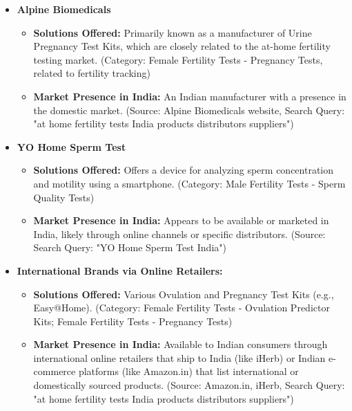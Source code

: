 \documentclass{article}
\begin{document}
\begin{itemize}[label=\textbullet]
    \item \textbf{Alpine Biomedicals}
    \begin{itemize}[label=--]
        \item \textbf{Solutions Offered:} Primarily known as a manufacturer of Urine Pregnancy Test Kits, which are closely related to the at-home fertility testing market. (Category: Female Fertility Tests - Pregnancy Tests, related to fertility tracking)
        \item \textbf{Market Presence in India:} An Indian manufacturer with a presence in the domestic market. (Source: Alpine Biomedicals website, Search Query: "at home fertility tests India products distributors suppliers")
    \end{itemize}
    \vspace{0.5em} %

    \item \textbf{YO Home Sperm Test}
    \begin{itemize}[label=--]
        \item \textbf{Solutions Offered:} Offers a device for analyzing sperm concentration and motility using a smartphone. (Category: Male Fertility Tests - Sperm Quality Tests)
        \item \textbf{Market Presence in India:} Appears to be available or marketed in India, likely through online channels or specific distributors. (Source: Search Query: "YO Home Sperm Test India")
    \end{itemize}
    \vspace{0.5em} %

    \item \textbf{International Brands via Online Retailers:}
    \begin{itemize}[label=--]
        \item \textbf{Solutions Offered:} Various Ovulation and Pregnancy Test Kits (e.g., Easy@Home). (Category: Female Fertility Tests - Ovulation Predictor Kits; Female Fertility Tests - Pregnancy Tests)
        \item \textbf{Market Presence in India:} Available to Indian consumers through international online retailers that ship to India (like iHerb) or Indian e-commerce platforms (like Amazon.in) that list international or domestically sourced products. (Source: Amazon.in, iHerb, Search Query: "at home fertility tests India products distributors suppliers")
    \end{itemize}
    \vspace{0.5em} %


\end{itemize}
\end{document}
